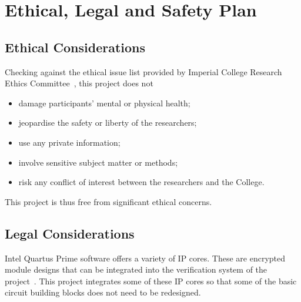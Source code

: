 \section{Ethical, Legal and Safety Plan}

\subsection{Ethical Considerations}

Checking against the ethical issue list provided by Imperial College Research
Ethics Committee~\cite{Imperial1}, this project does not
\begin{itemize}
  \item damage participants' mental or physical health;
  \item jeopardise the safety or liberty of the researchers;
  \item use any private information;
  \item involve sensitive subject matter or methods;
  \item risk any conflict of interest between the researchers and the College.
\end{itemize}
This project is thus free from significant ethical concerns.

\subsection{Legal Considerations}
Intel Quartus Prime software offers a variety of IP cores.
These are encrypted module designs that can be integrated into the
verification system of the project~\cite{Intel2}.
This project integrates some of these IP cores so that some of the basic
circuit building blocks does not need to be redesigned.

